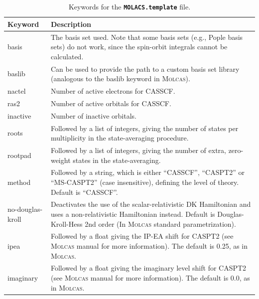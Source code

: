 \documentclass[a4paper,10pt,DIV=15,openany]{scrbook}
\newcommand{\ttt}[1]{\textbf{\texttt{#1}}}
\begin{document}
\begin{table}
  \centering
  \caption{Keywords for the \ttt{MOLACS.template} file.}
  \label{tab:molcas_temp}
  \begin{tabular}{>{\ttfamily}lp{12cm}}
  \hline
  Keyword       &Description\\
  \hline
basis           &The basis set used. Note that some basis sets (e.g., Pople basis sets) do not work, since the spin-orbit integrals cannot be calculated.\\
baslib          &Can be used to provide the path to a custom basis set library (analogous to the baslib keyword in \textsc{Molcas}).\\
nactel          &Number of active electrons for CASSCF.\\
ras2            &Number of active orbitals for CASSCF.\\
inactive        &Number of inactive orbitals.\\
roots           &Followed by a list of integers, giving the number of states per multiplicity in the state-averaging procedure.\\
rootpad         &Followed by a list of integers, giving the number of extra, zero-weight states in the state-averaging.\\
method          &Followed by a string, which is either ``CASSCF'', ``CASPT2'' or ``MS-CASPT2'' (case insensitive), defining the level of theory. Default is ``CASSCF''.\\
no-douglas-kroll&Deactivates the use of the scalar-relativistic DK Hamiltonian and uses a non-relativistic Hamiltonian instead. Default is Douglas-Kroll-Hess 2nd order  (In \textsc{Molcas} standard parametrization).\\
ipea            &Followed by a float giving the IP-EA shift for CASPT2 (see \textsc{Molcas} manual for more information). The default is 0.25, as in \textsc{Molcas}.\\
imaginary       &Followed by a float giving the imaginary level shift for CASPT2 (see \textsc{Molcas} manual for more information). The default is 0.0, as in \textsc{Molcas}.\\

\end{tabular}
\end{table}
\end{document}
